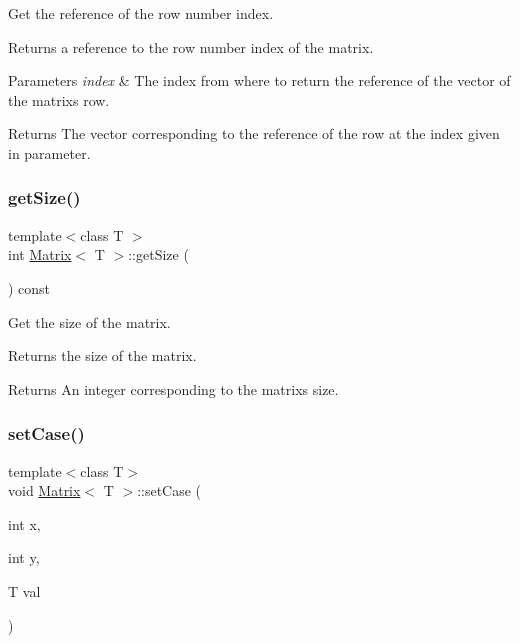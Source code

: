 Get the reference of the row number index. 

Returns a reference to the row number index of the matrix.


\begin{DoxyParams}{Parameters}
{\em index} & The index from where to return the reference of the vector of the matrix\textquotesingle{}s row. \\
\hline
\end{DoxyParams}
\begin{DoxyReturn}{Returns}
The vector corresponding to the reference of the row at the index given in parameter. 
\end{DoxyReturn}
\mbox{\label{class_matrix_ad51826b8a17c6c58df6b580893754543}} 
\subsubsection{\texorpdfstring{get\+Size()}{getSize()}}
{\footnotesize\ttfamily template$<$class T $>$ \\
int \mbox{\hyperlink{class_matrix}{Matrix}}$<$ T $>$\+::get\+Size (\begin{DoxyParamCaption}{ }\end{DoxyParamCaption}) const}



Get the size of the matrix. 

Returns the size of the matrix.

\begin{DoxyReturn}{Returns}
An integer corresponding to the matrix\textquotesingle{}s size. 
\end{DoxyReturn}
\mbox{\label{class_matrix_a84a92f3cf3e0555ef871c6e676c12e38}} 
\subsubsection{\texorpdfstring{set\+Case()}{setCase()}}
{\footnotesize\ttfamily template$<$class T$>$ \\
void \mbox{\hyperlink{class_matrix}{Matrix}}$<$ T $>$\+::set\+Case (\begin{DoxyParamCaption}\item[{int}]{x,  }\item[{int}]{y,  }\item[{T}]{val }\end{DoxyParamCaption})}



